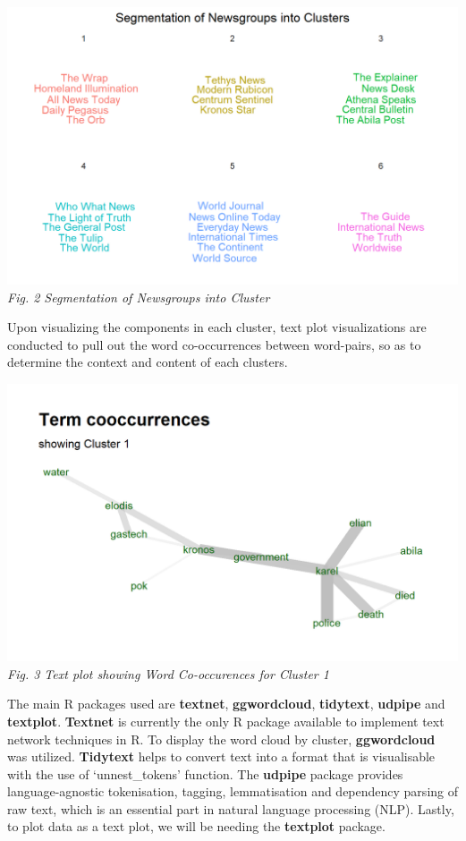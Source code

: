 \documentclass{acm_proc_article-sp}
\begin{document}
\includegraphics{img/image04.png} \emph{Fig. 2 Segmentation of
Newsgroups into Cluster}

Upon visualizing the components in each cluster, text plot
visualizations are conducted to pull out the word co-occurrences between
word-pairs, so as to determine the context and content of each clusters.

\includegraphics{img/image05.png} \emph{Fig. 3 Text plot showing Word
Co-occurences for Cluster 1}

The main R packages used are \textbf{textnet}, \textbf{ggwordcloud},
\textbf{tidytext}, \textbf{udpipe} and \textbf{textplot}.
\textbf{Textnet} is currently the only R package available to implement
text network techniques in R. To display the word cloud by cluster,
\textbf{ggwordcloud} was utilized. \textbf{Tidytext} helps to convert
text into a format that is visualisable with the use of `unnest\_tokens'
function. The \textbf{udpipe} package provides language-agnostic
tokenisation, tagging, lemmatisation and dependency parsing of raw text,
which is an essential part in natural language processing (NLP). Lastly,
to plot data as a text plot, we will be needing the \textbf{textplot}
package.
\end{document}
